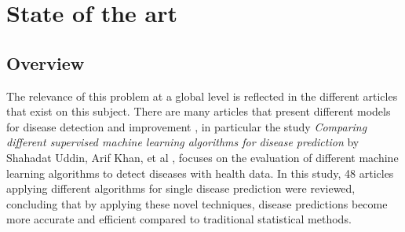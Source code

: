 %
\chapter{State of the art}
\label{ch::chapter3}

\section{Overview }

The relevance of this problem at a global level is reflected in the different articles that exist on this subject. There are many articles that present different models for disease detection and improvement \cite{Kohli2019, Chen2017}, in particular the study \textit{Comparing different supervised machine learning algorithms for disease prediction} by Shahadat Uddin, Arif Khan, et al \cite{Uddin2019}, focuses on the evaluation of different machine learning algorithms to detect diseases with health data. In this study, 48 articles applying different algorithms for single disease prediction were reviewed, concluding that by applying these novel techniques, disease predictions become more accurate and efficient compared to traditional statistical methods.

